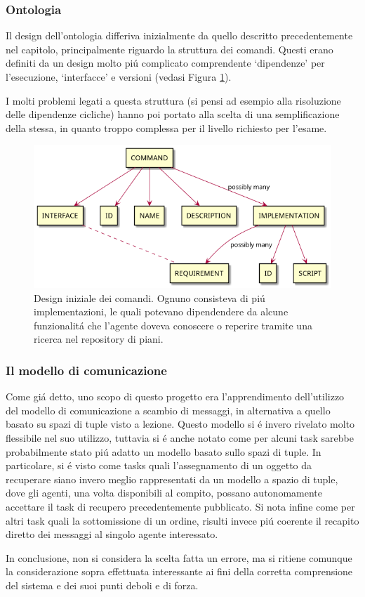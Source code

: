 \subsubsection{Ontologia}
Il design dell'ontologia differiva inizialmente da quello descritto precedentemente nel capitolo, principalmente riguardo la struttura dei comandi. Questi erano definiti da un design molto pi\'u complicato comprendente `dipendenze' per l'esecuzione, `interfacce' e versioni (vedasi Figura \ref{fig:ontology-old-commands}).

I molti problemi legati a questa struttura (si pensi ad esempio alla risoluzione delle dipendenze cicliche) hanno poi portato alla scelta di una semplificazione della stessa, in quanto troppo complessa per il livello richiesto per l'esame.
\begin{figure}[!ht]\centering
    \includegraphics[width=\textwidth]{section/design/figure/ontology/ontology-old-commands.png}
    \caption{Design iniziale dei comandi. Ognuno consisteva di pi\'u implementazioni, le quali potevano dipendendere da alcune funzionalit\'a che l'agente doveva conoscere o reperire tramite una ricerca nel repository di piani.}
    \label{fig:ontology-old-commands}
\end{figure}

\subsubsection{Il modello di comunicazione}
Come gi\'a detto, uno scopo di questo progetto era l'apprendimento dell'utilizzo del modello di comunicazione a scambio di messaggi, in alternativa a quello basato su spazi di tuple visto a lezione. Questo modello si \'e invero rivelato molto flessibile nel suo utilizzo, tuttavia si \'e anche notato come per alcuni task sarebbe probabilmente stato pi\'u adatto un modello basato sullo spazi di tuple. In particolare, si \'e visto come tasks quali l'assegnamento di un oggetto da recuperare siano invero meglio rappresentati da un modello a spazio di tuple, dove gli agenti, una volta disponibili al compito, possano autonomamente accettare il task di recupero precedentemente pubblicato. Si nota infine come per altri task quali la sottomissione di un ordine, risulti invece pi\'u coerente il recapito diretto dei messaggi al singolo agente interessato.

In conclusione, non si considera la scelta fatta un errore, ma si ritiene comunque la considerazione sopra effettuata interessante ai fini della corretta comprensione del sistema e dei suoi punti deboli e di forza.
